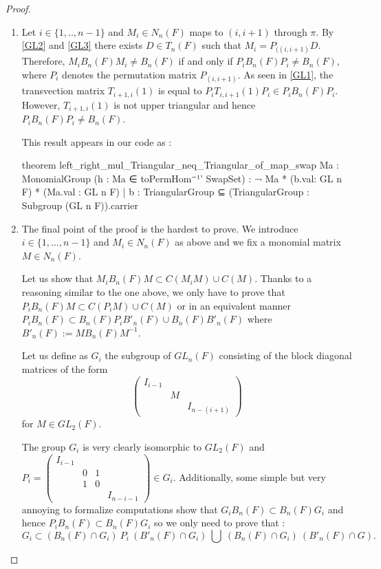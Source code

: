 \begin{proof}
\begin{enumerate}
\item Let $i \in  \{ 1,..,n-1\}$ and $M_i \in N_n(F)$ maps to $\left( i,i+1 \right)$ through $\pi$. By \ref{GL2} and \ref{GL3} there exists $D \in T_n(F)$ such that $M_i = P_{((i,i+1)} D$. Therefore, $M_i B_n(F) M_i \neq B_n(F)$ if and only if $P_{i} B_n(F) P_{i}\neq B_n(F)$, where $P_i$ denotes the permutation matrix $P_{(i,i+1)}$. As seen in \ref{GL1}, the transvection matrix $T_{i+1,i}(1)$ is equal to $P_{i} T_{i,i+1}(1) P_{i} \in P_{i}B_n(F) P_{i}$. However, $T_{i+1, i}(1)$ is not upper triangular and hence $P_{i} B_n(F) P_{i} \neq B_n(F)$.

    This result appears in our code as :
\begin{leancode}
theorem left_right_mul_Triangular_neq_Triangular_of_map_swap {Ma : MonomialGroup}
 (h : Ma ∈ toPermHom⁻¹' SwapSet) :
   ¬ {Ma * (b.val: GL n F) * (Ma.val : GL n F) | b :  TriangularGroup} ⊆
    (TriangularGroup : Subgroup (GL n F)).carrier
\end{leancode}




\item The final point of the proof is the hardest to prove. We introduce $i \in \{1,\ldots,n-1\}$ and $M_i \in N_n(F)$ as above and we fix a monomial matrix $M \in N_n(F)$. 

    Let us show that $M_i B_n(F) M \subset C(M_iM) \cup C(M) $. Thanks to a reasoning similar to the one above, we only have to prove that  $P_{i} B_n(F) M \subset C\left( P_i M \right)\cup C(M)$ or in an equivalent manner $P_i B_n(F) \subset B_n(F) P_i B'_n(F) \cup B_n(F) B'_n(F) $ where $B'_n(F) := M B_n(F)M^{-1}$.

    Let us define as $G_i$ the subgroup of $GL_n(F)$ consisting of the block diagonal matrices of the form 
    $$\begin{pmatrix} 
        I_{i-1} \\
        & M\\
        & & I_{n-(i+1)}
    \end{pmatrix}$$
    for $M \in GL_2\left( F \right)$.

    The group $G_i$ is very clearly isomorphic to $GL_2\left( F \right)$ and $P_i = 
    \left(\begin{smallmatrix}
        I_{i-1} \\ & 0 & 1 \\ & 1 & 0 \\ & & & I_{n-i-1}
    \end{smallmatrix} \right ) \in G_i$.
Additionally, some simple but very annoying to formalize computations show that $G_i B_n(F) \subset B_n(F) G_i$ and hence $P_i B_n(F) \subset B_n(F) G_i$ so we only need to prove that : 
    $$G_i \subset \left(B_n(F) \cap G_i\right) \ P_i \ \left( B'_n(F) \cap  G_i\right) \ \bigcup \ \left(B_n(F) \cap G_i\right) \ \left(B'_n(F) \cap G\right).$$


\end{enumerate}
\end{proof}
